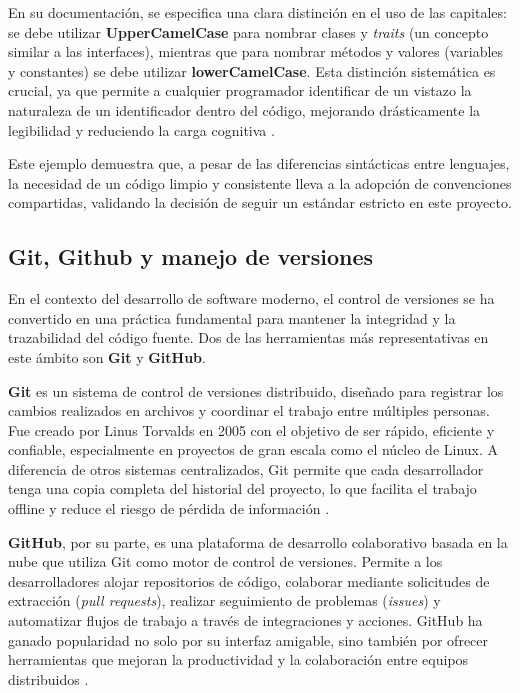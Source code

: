 \documentclass[12pt,letterpaper,spanish]{report}
\begin{document}
En su documentación, se especifica una clara distinción en el uso de las capitales: se debe utilizar \textbf{UpperCamelCase} para nombrar clases y \textit{traits} (un concepto similar a las interfaces), mientras que para nombrar métodos y valores (variables y constantes) se debe utilizar \textbf{lowerCamelCase}. Esta distinción sistemática es crucial, ya que permite a cualquier programador identificar de un vistazo la naturaleza de un identificador dentro del código, mejorando drásticamente la legibilidad y reduciendo la carga cognitiva \citep{ScalaStyleGuide}.

Este ejemplo demuestra que, a pesar de las diferencias sintácticas entre lenguajes, la necesidad de un código limpio y consistente lleva a la adopción de convenciones compartidas, validando la decisión de seguir un estándar estricto en este proyecto.

\subsection{Git, Github y manejo de versiones}
\label{sec:git}
En el contexto del desarrollo de software moderno, el control de versiones se ha convertido en una práctica fundamental para mantener la integridad y la trazabilidad del código fuente. Dos de las herramientas más representativas en este ámbito son \textbf{Git} y \textbf{GitHub}.

\textbf{Git} es un sistema de control de versiones distribuido, diseñado para registrar los cambios realizados en archivos y coordinar el trabajo entre múltiples personas. Fue creado por Linus Torvalds en 2005 con el objetivo de ser rápido, eficiente y confiable, especialmente en proyectos de gran escala como el núcleo de Linux. A diferencia de otros sistemas centralizados, Git permite que cada desarrollador tenga una copia completa del historial del proyecto, lo que facilita el trabajo offline y reduce el riesgo de pérdida de información \cite{progit}.

\textbf{GitHub}, por su parte, es una plataforma de desarrollo colaborativo basada en la nube que utiliza Git como motor de control de versiones. Permite a los desarrolladores alojar repositorios de código, colaborar mediante solicitudes de extracción (\textit{pull requests}), realizar seguimiento de problemas (\textit{issues}) y automatizar flujos de trabajo a través de integraciones y acciones. GitHub ha ganado popularidad no solo por su interfaz amigable, sino también por ofrecer herramientas que mejoran la productividad y la colaboración entre equipos distribuidos \cite{githubdocs}.
\end{document}

